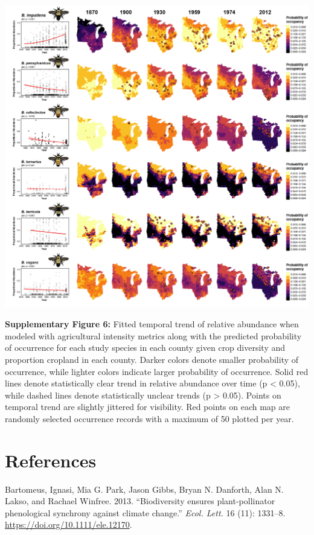 \documentclass[11pt,]{article}
\begin{document}
\includegraphics[width=1\textwidth,height=\textheight]{../ms_figs/fig4b.png}

\textbf{Supplementary Figure 6:} Fitted temporal trend of relative
abundance when modeled with agricultural intensity metrics along with
the predicted probability of occurrence for each study species in each
county given crop diversity and proportion cropland in each county.
Darker colors denote smaller probability of occurrence, while lighter
colors indicate larger probability of occurrence. Solid red lines denote
statistically clear trend in relative abundance over time (p \textless{}
0.05), while dashed lines denote statistically unclear trends (p
\textgreater{} 0.05). Points on temporal trend are slightly jittered for
visibility. Red points on each map are randomly selected occurrence
records with a maximum of 50 plotted per year.

\clearpage

\hypertarget{references}{%
\section*{References}\label{references}}

\hypertarget{refs}{}
\leavevmode\hypertarget{ref-Bartomeus2013}{}%
Bartomeus, Ignasi, Mia G. Park, Jason Gibbs, Bryan N. Danforth, Alan N.
Lakso, and Rachael Winfree. 2013. ``Biodiversity ensures
plant-pollinator phenological synchrony against climate change.''
\emph{Ecol. Lett.} 16 (11): 1331--8.
\url{https://doi.org/10.1111/ele.12170}.
\end{document}
